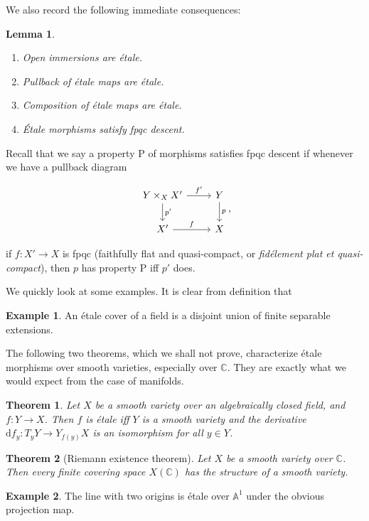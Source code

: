 \documentclass{shortart}
\newtheorem*{thm}{Theorem}
\newtheorem*{lemma}{Lemma}
\theoremstyle{definition}
\newtheorem*{eg}{Example}
\newcommand\A{\mathbb{A}}
\newcommand\C{\mathbb{C}}
\begin{document}
We also record the following immediate consequences:
\begin{lemma}\leavevmode
  \begin{enumerate}
    \item Open immersions are \'etale.
    \item Pullback of \'etale maps are \'etale.
    \item Composition of \'etale maps are \'etale.
    \item \'Etale morphisms satisfy fpqc descent.\fakeqed
  \end{enumerate}
\end{lemma}
Recall that we say a property P of morphisms satisfies fpqc descent if whenever we have a pullback diagram
\begin{useimager}
  \[
    \begin{tikzcd}
      Y \times_X X' \ar[d, "p'"] \ar[r, "f'"] & Y \ar[d, "p"]\\
      X' \ar[r, "f"] & X
    \end{tikzcd},
  \]
\end{useimager}
if $f: X' \to X$ is fpqc (faithfully flat and quasi-compact, or \emph{fid\'element plat et quasi-compact}), then $p$ has property P iff $p'$ does.

We quickly look at some examples. It is clear from definition that
\begin{eg}
  An \'etale cover of a field is a disjoint union of finite separable extensions.\qedhere
\end{eg}

The following two theorems, which we shall not prove, characterize \'etale morphisms over smooth varieties, especially over $\C$. They are exactly what we would expect from the case of manifolds.
\begin{thm}
  Let $X$ be a smooth variety over an algebraically closed field, and $f: Y \to X$. Then $f$ is \'etale iff $Y$ is a smooth variety and the derivative $\mathrm{d} f_y: T_y Y \to Y_{f(y)}X$ is an isomorphism for all $y \in Y$.\fakeqed
\end{thm}
\begin{thm}[Riemann existence theorem]
  Let $X$ be a smooth variety over $\C$. Then every finite covering space $X(\C)$ has the structure of a smooth variety.\fakeqed
\end{thm}

\begin{eg}
  The line with two origins is \'etale over $\A^1$ under the obvious projection map.
\end{eg}
\end{document}
